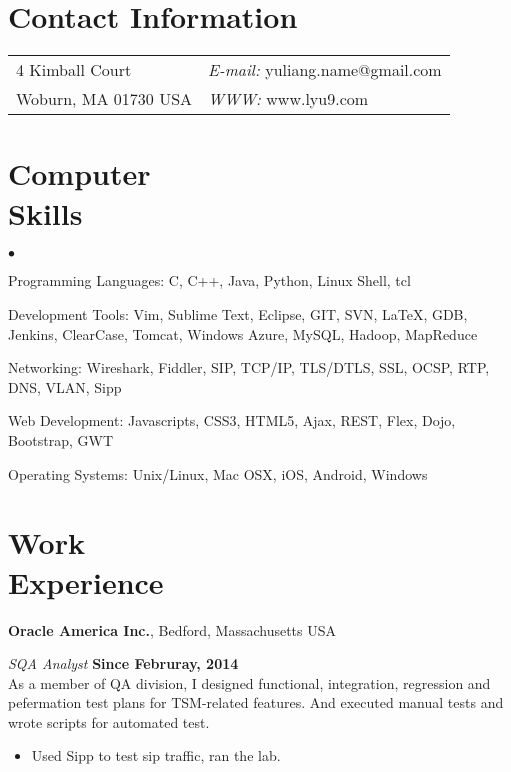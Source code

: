 \documentclass[margin,line]{res}
\newenvironment{list2}{
  \begin{list}{$\bullet$}{%
      \setlength{\itemsep}{0in}
      \setlength{\parsep}{0in} \setlength{\parskip}{0in}
      \setlength{\topsep}{0in} \setlength{\partopsep}{0in} 
      \setlength{\leftmargin}{0.2in}}}{\end{list}}
\begin{document}

\begin{resume}
\section{\sc Contact Information}
\vspace{.05in}
\begin{tabular}{@{}p{2in}p{4in}}  
4 Kimball Court & {\it E-mail:}  yuliang.name@gmail.com \\       
Woburn, MA 01730 USA  & {\it WWW:} www.lyu9.com \\     
\end{tabular}

\section{\sc Computer\\Skills} 
\begin{list2}
\item Programming Languages: C, C++, Java, Python, Linux Shell, tcl
\item Development Tools: Vim, Sublime Text, Eclipse, GIT, SVN, \LaTeX, 
                         GDB, Jenkins, ClearCase, Tomcat, Windows Azure, 
                         MySQL, Hadoop, MapReduce
\item Networking: Wireshark, Fiddler, SIP, TCP/IP, TLS/DTLS, 
                  SSL, OCSP, RTP, DNS, VLAN, Sipp
\item Web Development: Javascripts, CSS3, HTML5, Ajax, 
                       REST, Flex, Dojo, Bootstrap, GWT
\item Operating Systems:  Unix/Linux, Mac OSX, iOS, Android, Windows\\
\end{list2}

\section{\sc Work\\Experience}
{\bf Oracle America Inc.}, Bedford, Massachusetts USA

\vspace{-.3cm}
{\em SQA Analyst} \hfill {\bf Since Februray, 2014}\\
As a member of QA division, I designed functional, integration, regression
and pefermation test plans for TSM-related features. And executed manual tests
and wrote scripts for automated test.
\begin{itemize}
\item Used Sipp to test sip traffic, ran the lab.
\end{itemize}


\end{resume}
\end{document}

